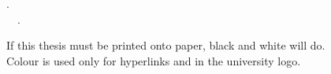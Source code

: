 \vspace*{\fill}

\begin{information}

\thetitle. \\
\textcopyright~\theyear~\theauthor.


If this thesis must be printed onto paper, black and white will do. \\
Colour is used only for hyperlinks and in the university logo.

\end{information}

\vspace{5em}
